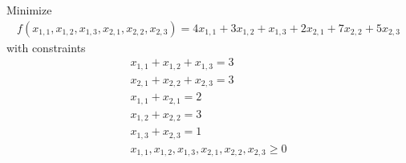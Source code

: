 \documentclass[11pt]{article}
\begin{document}
\begin{sol}
Minimize 
\begin{eqnarray*}
f(x_{1,1},x_{1,2},x_{1,3},x_{2,1},x_{2,2},x_{2,3}) = 4x_{1,1} + 3x_{1,2} + x_{1,3} + 2x_{2,1} + 7x_{2,2} + 5x_{2,3}
\end{eqnarray*}
with constraints 
\begin{eqnarray*}
x_{1,1} + x_{1,2} + x_{1,3} = 3 \\
x_{2,1} + x_{2,2} + x_{2,3} = 3 \\
x_{1,1} + x_{2,1} = 2 \\
x_{1,2} + x_{2,2} = 3 \\
x_{1,3} + x_{2,3} = 1 \\
x_{1,1}, x_{1,2}, x_{1,3}, x_{2,1}, x_{2,2}, x_{2,3} \geq 0 
\end{eqnarray*}
\end{sol}
\end{document}
